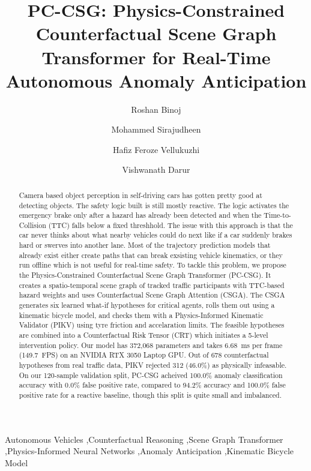 \documentclass[preprint,12pt]{elsarticle}
\begin{document}
\begin{frontmatter}

\title{PC-CSG: Physics-Constrained Counterfactual Scene Graph Transformer for Real-Time Autonomous Anomaly Anticipation}

\author[1]{Roshan Binoj}
\author[1]{Mohammed Sirajudheen}
\author[1]{Hafiz Feroze Vellukuzhi}
\author[1]{Vishwanath Darur}

\address[1]{Department of Computer Science and Engineering, Indian Institute of Information Technology Kottayam, Kerala 686635, India}

\begin{abstract}
Camera based object perception in self-driving cars has gotten pretty good at detecting objects. The safety logic built is still mostly reactive. The logic activates the emergency brake only after a hazard has already been detected and when the Time-to-Collision (TTC) falls below a fixed threshhold. The issue with this approach is that the car never thinks about what nearby vehicles could do next like if a car suddenly brakes hard or swerves into another lane. Most of the trajectory prediction models that already exist either create paths that can break exsisting vehicle kinematics, or they run offline which is not useful for real-time safety. To tackle this problem, we propose the Physics-Constrained Counterfactual Scene Graph Transformer (PC-CSG). It creates a spatio-temporal scene graph of tracked traffic participants with TTC-based hazard weights and uses Counterfactual Scene Graph Attention (CSGA). The CSGA generates six learned what-if hypotheses for critical agents, rolls them out using a kinematic bicycle model, and checks them with a Physics-Informed Kinematic Validator (PIKV) using tyre friction and accelaration limits. The feasible hypotheses are combined into a Counterfactual Risk Tensor (CRT) which initiates a 5-level intervention policy. Our model has 372,068 parameters and takes 6.68~ms per frame (149.7~FPS) on an NVIDIA RTX 3050 Laptop GPU. Out of 678 counterfactual hypotheses from real traffic data, PIKV rejected 312 (46.0\%) as physically infeasable. On our 120-sample validation split, PC-CSG acheived 100.0\% anomaly classification accuracy with 0.0\% false positive rate, compared to 94.2\% accuracy and 100.0\% false positive rate for a reactive baseline, though this split is quite small and imbalanced.
\end{abstract}

\begin{keyword}
Autonomous Vehicles \sep Counterfactual Reasoning \sep Scene Graph Transformer \sep Physics-Informed Neural Networks \sep Anomaly Anticipation \sep Kinematic Bicycle Model
\end{keyword}

\end{frontmatter}
\end{document}
